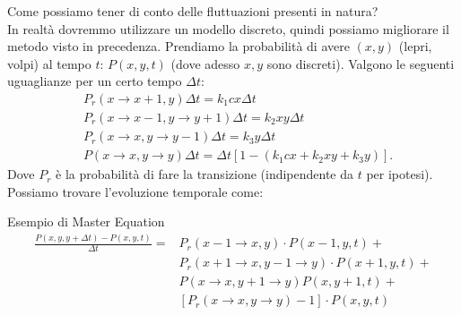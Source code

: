 Come possiamo tener di conto delle fluttuazioni presenti in natura?\\
In realtà dovremmo utilizzare un modello discreto, quindi possiamo migliorare il metodo visto in precedenza. Prendiamo la probabilità di avere $(x,y)$ (lepri, volpi) al tempo $t$: $P(x,y,t)$ (dove adesso $x,y$ sono discreti). Valgono le seguenti uguaglianze per un certo tempo $\Delta t$:
\[\begin{aligned}
    &P_r(x\to x+1, y) \Delta t = k_1 c x \Delta t\\
    &P_r(x\to x-1, y \to y+1) \Delta t  = k_2xy\Delta t\\
    &P_r(x\to x,y\to y-1) \Delta t = k_3 y \Delta t\\
    &P(x\to x,y\to y) \Delta t = \Delta t \left[  1 - \left(k_1cx+ k_2xy + k_3 y\right)\right]
.\end{aligned}\]
Dove $P_r$ è la probabilità di fare la transizione (indipendente da $t$ per ipotesi).
Possiamo trovare l'evoluzione temporale come:
\begin{redbox}{Esempio di Master Equation}
    \begin{equation}
        \begin{aligned}
	    \frac{P(x,y,y+\Delta  t) - P(x,y,t)}{\Delta  t}  =& P_r(x-1\to x, y) \cdot P(x-1,y,t) +\\
				&P_r(x+1\to x, y-1\to y) \cdot P(x+1,y,t) + \\
				&P(x\to x, y+1\to y) P(x,y+1,t) + \\
				& \left[P_r(x\to x, y\to y) - 1\right]\cdot P(x,y,t) 
        \end{aligned}
    \end{equation}
\end{redbox}
